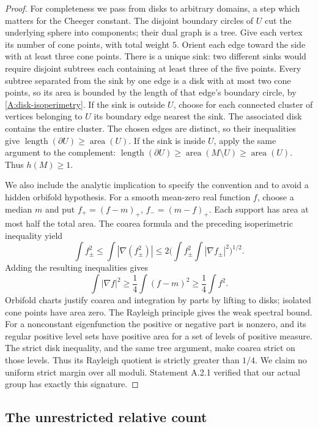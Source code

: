 \begin{proof}
For completeness we pass from disks to arbitrary domains, a step
which matters for the Cheeger constant. The disjoint boundary circles
of $U$ cut the underlying sphere into components; their dual graph is
a tree. Give each vertex its number of cone points, with total weight
$5$. Orient each edge toward the side with at least three cone points.
There is a unique sink: two different sinks would require disjoint
subtrees each containing at least three of the five points. Every
subtree separated from the sink by one edge is a disk with at most
two cone points, so its area is bounded by the length of that edge's
boundary circle, by \eqref{A:disk-isoperimetry}.
If the sink is outside $U$, choose for each connected cluster of
vertices belonging to $U$ its boundary edge nearest the sink. The
associated disk contains the entire cluster. The chosen edges are
distinct, so their inequalities give
$\operatorname{length}(\partial U)\geq\operatorname{area}(U)$.
If the sink is inside $U$, apply the same argument to the complement:
$\operatorname{length}(\partial U)\geq
\operatorname{area}(M\setminus U)\geq\operatorname{area}(U)$.
Thus $h(M)\geq1$.

We also include the analytic implication to specify the convention
and to avoid a hidden orbifold hypothesis. For a smooth mean-zero
real function $f$, choose a median $m$ and put
$f_+=(f-m)_+$, $f_-=(m-f)_+$. Each support has area at most half
the total area. The coarea formula and the preceding isoperimetric
inequality yield
\[
 \int f_\pm^2\leq\int|\nabla(f_\pm^2)|
 \leq2\Big(\int f_\pm^2\int|\nabla f_\pm|^2\Big)^{1/2}.
\]
Adding the resulting inequalities gives
\[
 \int|\nabla f|^2\geq\frac14\int(f-m)^2
 \geq\frac14\int f^2.
\]
Orbifold charts justify coarea and integration by parts by lifting
to disks; isolated cone points have area zero. The Rayleigh
principle gives the weak spectral bound. For a nonconstant
eigenfunction the positive or negative part is nonzero, and its regular
positive level sets have positive area for a set of levels of positive
measure. The strict disk inequality, and the same tree argument, make
coarea strict on those levels. Thus its Rayleigh quotient is strictly
greater than $1/4$. We claim no uniform strict margin over all moduli.
Statement A.2.1
verified that our actual group has exactly this signature.
\end{proof}

\subsection{The unrestricted relative count}
